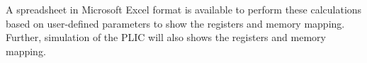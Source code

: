 A spreadsheet in Microsoft Excel format is available to perform these
calculations based on user-defined parameters to show the registers and
memory mapping. Further, simulation of the PLIC will also shows the
registers and memory mapping.

%
%
%
%
%
%
%
%
%
%
%
